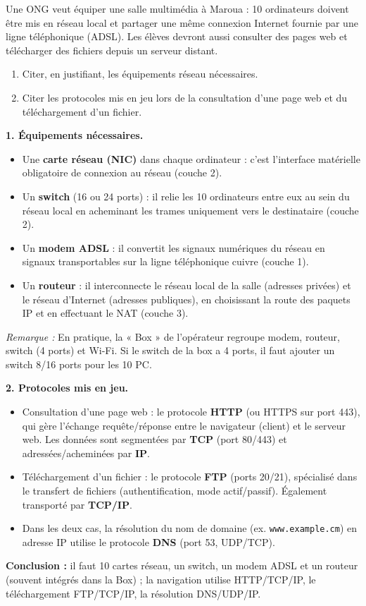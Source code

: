 \documentclass[11pt]{article}
\begin{document}
\begin{exoresolu}
Une ONG veut équiper une salle multimédia à Maroua : 10 ordinateurs doivent être mis en réseau local et partager une même connexion Internet fournie par une ligne téléphonique (ADSL). Les élèves devront aussi consulter des pages web et télécharger des fichiers depuis un serveur distant.
\begin{enumerate}
\item Citer, en justifiant, les équipements réseau nécessaires.
\item Citer les protocoles mis en jeu lors de la consultation d'une page web et du téléchargement d'un fichier.
\end{enumerate}
\tcblower
\textbf{1. Équipements nécessaires.}
\begin{itemize}
\item Une \textbf{carte réseau (NIC)} dans chaque ordinateur : c'est l'interface matérielle obligatoire de connexion au réseau (couche 2).
\item Un \textbf{switch} (16 ou 24 ports) : il relie les 10 ordinateurs entre eux au sein du réseau local en acheminant les trames uniquement vers le destinataire (couche 2).
\item Un \textbf{modem ADSL} : il convertit les signaux numériques du réseau en signaux transportables sur la ligne téléphonique cuivre (couche 1).
\item Un \textbf{routeur} : il interconnecte le réseau local de la salle (adresses privées) et le réseau d'Internet (adresses publiques), en choisissant la route des paquets IP et en effectuant le NAT (couche 3).
\end{itemize}
\textit{Remarque :} En pratique, la « Box » de l'opérateur regroupe modem, routeur, switch (4 ports) et Wi-Fi. Si le switch de la box a 4 ports, il faut ajouter un switch 8/16 ports pour les 10 PC.

\textbf{2. Protocoles mis en jeu.}
\begin{itemize}
\item Consultation d'une page web : le protocole \textbf{HTTP} (ou HTTPS sur port 443), qui gère l'échange requête/réponse entre le navigateur (client) et le serveur web. Les données sont segmentées par \textbf{TCP} (port 80/443) et adressées/acheminées par \textbf{IP}.
\item Téléchargement d'un fichier : le protocole \textbf{FTP} (ports 20/21), spécialisé dans le transfert de fichiers (authentification, mode actif/passif). Également transporté par \textbf{TCP/IP}.
\item Dans les deux cas, la résolution du nom de domaine (ex. \texttt{www.example.cm}) en adresse IP utilise le protocole \textbf{DNS} (port 53, UDP/TCP).
\end{itemize}
\textbf{Conclusion :} il faut 10 cartes réseau, un switch, un modem ADSL et un routeur (souvent intégrés dans la Box) ; la navigation utilise HTTP/TCP/IP, le téléchargement FTP/TCP/IP, la résolution DNS/UDP/IP.
\end{exoresolu}
\end{document}
